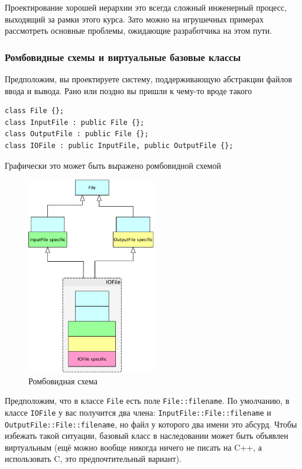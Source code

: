 \documentclass[a4paper,12pt,oneside]{article}
\begin{document}
Проектирование хорошей иерархии это всегда сложный инженерный процесс, выходящий за рамки этого курса. Зато можно на игрушечных примерах рассмотреть основные проблемы, ожидающие разработчика на этом пути.

\subsubsection{Ромбовидные схемы и виртуальные базовые классы}

Предположим, вы проектируете систему, поддерживающую абстракции файлов ввода и вывода. Рано или поздно вы пришли к чему-то вроде такого

\begin{lstlisting}
class File {};
class InputFile : public File {};
class OutputFile : public File {};
class IOFile : public InputFile, public OutputFile {};
\end{lstlisting}

Графически это может быть выражено ромбовидной схемой

\begin{figure}[h!]
\centering
\includegraphics[width=0.5\textwidth]{illustrations/romb-crop.pdf}
\caption{Ромбовидная схема}
\label{fig:romb-crop}
\end{figure}

Предположим, что в классе \lstinline!File! есть поле \lstinline!File::filename!. По умолчанию, в классе \lstinline!IOFile! у вас получится два члена: \lstinline!InputFile::File::filename! и \lstinline!OutputFile::File::filename!, но файл у которого два имени это абсурд. Чтобы избежать такой ситуации, базовый класс в наследовании может быть объявлен виртуальным (ещё можно вообще никогда ничего не писать на C++, а использовать C, это предпочтительный вариант).
\end{document}

